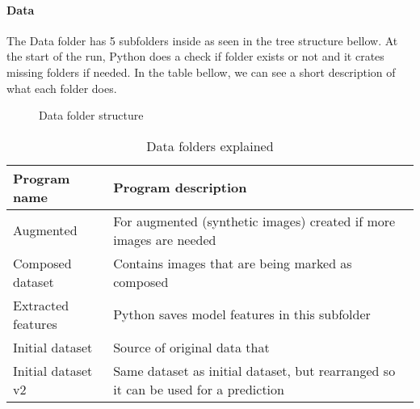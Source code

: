 \paragraph{Data}
The Data folder has 5 subfolders inside as seen in the tree structure bellow. At the start of the run, Python does a check if folder exists or not and it crates missing folders if needed. 
\newline
In the table bellow, we can see a short description of what each folder does.
\newline

\begin{figure}[!ht]
    \caption{Data folder structure}
\end{figure}

\begin{table}[!ht]
  \centering
    \begin{tabular}{ |m{13em}|m{19em}| } 
     \hline
        Program name & Program description \\ 
     \hline
        Augmented & For augmented (synthetic images) created if more images are needed \\
     \hline
        Composed dataset & Contains images that are being marked as composed \\
     \hline
        Extracted features & Python saves model features in this subfolder \\
     \hline
        Initial dataset & Source of original data that \\
     \hline
        Initial dataset v2 & Same dataset as initial dataset, but rearranged so it can be used for a prediction \\
     \hline
    \end{tabular}
\caption{Data folders explained}
\end{table}

